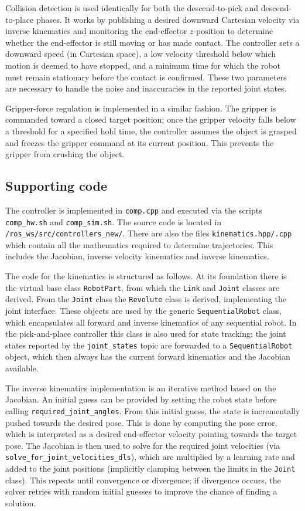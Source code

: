 \documentclass[12pt,a4paper]{article}
\begin{document}
Collision detection is used identically for both the descend-to-pick and descend-to-place
phases.  It works by publishing a desired downward Cartesian velocity via inverse kinematics
and monitoring the end-effector $z$-position to determine whether the end-effector is still
moving or has made contact.  The controller sets a downward speed (in Cartesian space), a
low velocity threshold below which motion is deemed to have stopped, and a minimum time for
which the robot must remain stationary before the contact is confirmed.  These two parameters
are necessary to handle the noise and inaccuracies in the reported joint states.

Gripper-force regulation is implemented in a similar fashion.  The gripper is commanded
toward a closed target position; once the gripper velocity falls below a threshold for a
specified hold time, the controller assumes the object is grasped and freezes the gripper
command at its current position.  This prevents the gripper from crushing the object.

\subsection*{Supporting code}

The controller is implemented in \texttt{comp.cpp} and executed via the scripts
\texttt{comp\_hw.sh} and \texttt{comp\_sim.sh}.  The source code is located in
\texttt{/ros\_ws/src/controllers\_new/}.  There are also the files
\texttt{kinematics.hpp/.cpp} which contain all the mathematics required to determine
trajectories.  This includes the Jacobian, inverse velocity kinematics and inverse
kinematics.

The code for the kinematics is structured as follows.  At its foundation there is the
virtual base class \texttt{RobotPart}, from which the \texttt{Link} and \texttt{Joint}
classes are derived.  From the \texttt{Joint} class the \texttt{Revolute} class is derived,
implementing the joint interface.  These objects are used by the generic
\texttt{SequentialRobot} class, which encapsulates all forward and inverse kinematics of
any sequential robot.  In the pick-and-place controller this class is also used for state
tracking: the joint states reported by the \texttt{joint\_states} topic are forwarded to a
\texttt{SequentialRobot} object, which then always has the current forward kinematics and
the Jacobian available.

The inverse kinematics implementation is an iterative method based on the Jacobian.  An
initial guess can be provided by setting the robot state before calling
\texttt{required\_joint\_angles}.  From this initial guess, the state is incrementally
pushed towards the desired pose.  This is done by computing the pose error, which is
interpreted as a desired end-effector velocity pointing towards the target pose.  The
Jacobian is then used to solve for the required joint velocities (via
\texttt{solve\_for\_joint\_velocities\_dls}), which are multiplied by a learning rate and
added to the joint positions (implicitly clamping between the limits in the \texttt{Joint}
class).  This repeats until convergence or divergence; if divergence occurs, the solver
retries with random initial guesses to improve the chance of finding a solution.
\end{document}
